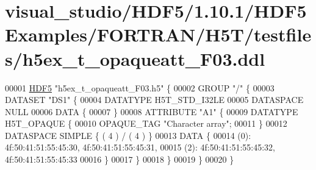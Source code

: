 \hypertarget{visual__studio_2_h_d_f5_21_810_81_2_h_d_f5_examples_2_f_o_r_t_r_a_n_2_h5_t_2testfiles_2h5ex__t__opaqueatt___f03_8ddl_source}{}\section{visual\+\_\+studio/\+H\+D\+F5/1.10.1/\+H\+D\+F5\+Examples/\+F\+O\+R\+T\+R\+A\+N/\+H5\+T/testfiles/h5ex\+\_\+t\+\_\+opaqueatt\+\_\+\+F03.ddl}
\label{visual__studio_2_h_d_f5_21_810_81_2_h_d_f5_examples_2_f_o_r_t_r_a_n_2_h5_t_2testfiles_2h5ex__t__opaqueatt___f03_8ddl_source}

\begin{DoxyCode}
00001 \hyperlink{namespace_h_d_f5}{HDF5} \textcolor{stringliteral}{"h5ex\_t\_opaqueatt\_F03.h5"} \{
00002 GROUP \textcolor{stringliteral}{"/"} \{
00003    DATASET \textcolor{stringliteral}{"DS1"} \{
00004       DATATYPE  H5T\_STD\_I32LE
00005       DATASPACE  NULL
00006       DATA \{
00007       \}
00008       ATTRIBUTE \textcolor{stringliteral}{"A1"} \{
00009          DATATYPE  H5T\_OPAQUE \{
00010             OPAQUE\_TAG \textcolor{stringliteral}{"Character array"};
00011          \}
00012          DATASPACE  SIMPLE \{ ( 4 ) / ( 4 ) \}
00013          DATA \{
00014          (0): 4f:50:41:51:55:45:30, 4f:50:41:51:55:45:31,
00015          (2): 4f:50:41:51:55:45:32, 4f:50:41:51:55:45:33
00016          \}
00017       \}
00018    \}
00019 \}
00020 \}
\end{DoxyCode}
